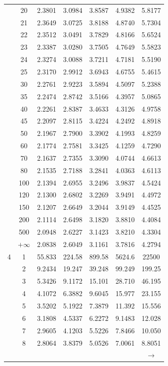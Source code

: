 \begin{minipage}{0.49\textwidth}
\begin{center}
\begin{tabular}{ccccccc}
			& 20 & 2.3801 & 3.0984 & 3.8587 & 4.9382 & 5.8177 \\
			& 21 & 2.3649 & 3.0725 & 3.8188 & 4.8740 & 5.7304 \\
			& 22 & 2.3512 & 3.0491 & 3.7829 & 4.8166 & 5.6524 \\
			& 23 & 2.3387 & 3.0280 & 3.7505 & 4.7649 & 5.5823 \\
			& 24 & 2.3274 & 3.0088 & 3.7211 & 4.7181 & 5.5190 \\
			& 25 & 2.3170 & 2.9912 & 3.6943 & 4.6755 & 5.4615 \\
			& 30 & 2.2761 & 2.9223 & 3.5894 & 4.5097 & 5.2388 \\
			& 35 & 2.2474 & 2.8742 & 3.5166 & 4.3957 & 5.0865 \\
			& 40 & 2.2261 & 2.8387 & 3.4633 & 4.3126 & 4.9758 \\
			& 45 & 2.2097 & 2.8115 & 3.4224 & 4.2492 & 4.8918 \\[5pt]
			& 50 & 2.1967 & 2.7900 & 3.3902 & 4.1993 & 4.8259 \\
			& 60 & 2.1774 & 2.7581 & 3.3425 & 4.1259 & 4.7290 \\
			& 70 & 2.1637 & 2.7355 & 3.3090 & 4.0744 & 4.6613 \\
			& 80 & 2.1535 & 2.7188 & 3.2841 & 4.0363 & 4.6113 \\
			& 100 & 2.1394 & 2.6955 & 3.2496 & 3.9837 & 4.5424 \\
			& 120 & 2.1300 & 2.6802 & 3.2269 & 3.9491 & 4.4972 \\
			& 150 & 2.1207 & 2.6649 & 3.2044 & 3.9149 & 4.4525 \\
			& 200 & 2.1114 & 2.6498 & 3.1820 & 3.8810 & 4.4084 \\
			& 500 & 2.0948 & 2.6227 & 3.1423 & 3.8210 & 4.3304 \\
			& $+\infty$ & 2.0838 & 2.6049 & 3.1161 & 3.7816 & 4.2794 \\
			\midrule
			4 & 1 & 55.833 & 224.58 & 899.58 & 5624.6 & 22500 \\
			& 2 & 9.2434 & 19.247 & 39.248 & 99.249 & 199.25 \\
			& 3 & 5.3426 & 9.1172 & 15.101 & 28.710 & 46.195 \\
			& 4 & 4.1072 & 6.3882 & 9.6045 & 15.977 & 23.155 \\
			& 5 & 3.5202 & 5.1922 & 7.3879 & 11.392 & 15.556 \\
			& 6 & 3.1808 & 4.5337 & 6.2272 & 9.1483 & 12.028 \\
			& 7 & 2.9605 & 4.1203 & 5.5226 & 7.8466 & 10.050 \\
			& 8 & 2.8064 & 3.8379 & 5.0526 & 7.0061 & 8.8051 \\
			 &  &  &  &  &  & $\rightarrow$ \\
		\end{tabular}
	\end{center}
\end{minipage}
